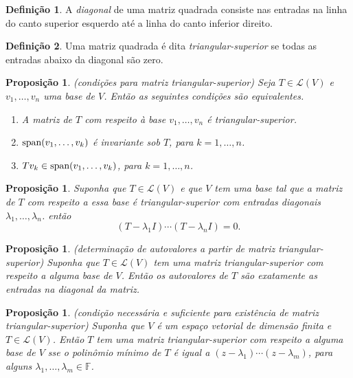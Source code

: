 \documentclass[12pt]{article}
\theoremstyle{plain}
\newtheorem{prop}[thm]{Proposição}
\theoremstyle{definition}
\newtheorem{defn}{Definição}[section]
\theoremstyle{remark}
\begin{document}
\begin{defn}
    A \emph{diagonal} de uma matriz quadrada consiste nas entradas na linha do canto superior esquerdo até a linha do canto inferior direito.
\end{defn}

\begin{defn}
    Uma matriz quadrada é dita \emph{triangular-superior} se todas as entradas abaixo da diagonal são zero.
\end{defn}

\begin{prop} (condições para matriz triangular-superior)
    Seja \(T \in \mathcal{L}(V)\) e \(v_1, \ldots, v_n\) uma base de \(V\). Então as seguintes condições são equivalentes.
    \begin{enumerate}
        \item[\textup{(a)}] A matriz de \(T\) com respeito à base \(v_1, \ldots, v_n\) é triangular-superior.
        \item[\textup{(b)}] \(\textup{span}(v_1, \ldots, v_k)\) é invariante sob \(T\), para \(k = 1, \ldots, n\).
        \item[\textup{(c)}] \(Tv_k \in \textup{span}(v_1, \ldots, v_k)\), para \(k = 1, \ldots, n\).
    \end{enumerate}
\end{prop}

\begin{prop}
    Suponha que \(T \in \mathcal{L}(V)\) e que \(V\) tem uma base tal que a matriz de \(T\) com respeito a essa base é triangular-superior com entradas diagonais \(\lambda_1, \ldots, \lambda_n\). então
    \[
        (T - \lambda_1I)\cdots(T - \lambda_n I) = 0.
    \]
\end{prop}

\begin{prop} (determinação de autovalores a partir de matriz triangular-superior)
    Suponha que \(T \in \mathcal{L}(V)\) tem uma matriz triangular-superior com respeito a alguma base de \(V\). Então os autovalores de \(T\) são exatamente as entradas na diagonal da matriz.
\end{prop}

\begin{prop} (condição necessária e suficiente para existência de matriz triangular-superior)
    Suponha que \(V\) é um espaço vetorial de dimensão finita e \(T \in \mathcal{L}(V)\). Então \(T\) tem uma matriz triangular-superior com respeito a alguma base de \(V\) sse o polinômio mínimo de \(T\) é igual a \((z - \lambda_1) \cdots (z - \lambda_m)\), para alguns \(\lambda_1, \ldots, \lambda_m \in \mathbb{F}\).
\end{prop}
\end{document}
